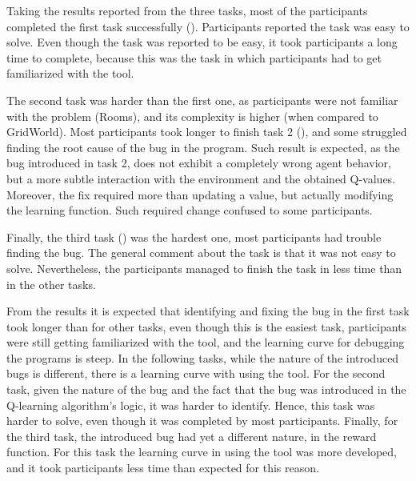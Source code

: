 Taking the results reported from the three tasks, most of the participants completed the first task successfully (). Participants reported the task was easy to solve. Even though the task 
was reported to be easy, it took participants a long time to complete, because this was the task in 
which participants had to get familiarized with the tool. 

The second task was harder than the first one, as participants were not familiar with the problem (\ie Rooms), and its complexity is higher (when compared to GridWorld). Most participants took 
longer to finish task 2 (), and some struggled finding the root cause of the bug in the program.  Such result is expected, as the bug introduced in task 2, does not exhibit a completely wrong agent behavior, but a more subtle interaction with the environment and the obtained Q-values. Moreover, the fix required more than updating a value, but actually modifying the learning function. Such required change confused to some participants. 

Finally, the third task () was the hardest one, most participants had trouble finding the bug. The general comment about the task is that it was not easy to solve. Nevertheless, the participants managed to finish the task in less time than in the other tasks. 

From the results it is expected that identifying and fixing the bug in the first task took longer than for other tasks, even though this is the easiest task, participants were still getting familiarized with the tool, and the learning curve for debugging the programs is steep. In the following tasks, while the nature of the introduced bugs is different, there is a learning curve  with using the tool. For the second task, given the nature of the bug and the fact that the bug was introduced in the Q-learning algorithm's logic, it was harder to identify. Hence, this task was harder to solve, even though it was completed by most participants. Finally, for the third task, the introduced bug had yet a different nature, in the  reward function. For this task the learning curve in using the tool was more developed, and it took participants less time than expected for this reason.


